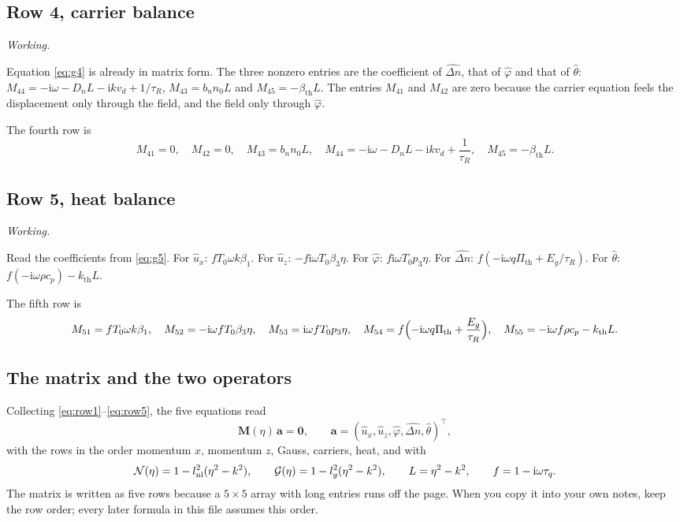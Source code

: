 \documentclass[11pt,a4paper]{article}
\newif\ifshowworked \showworkedtrue
\newenvironment{worked}{\ifshowworked\par\smallskip\noindent\textit{Working.}\par\else\setbox0\vbox\bgroup\fi}{\ifshowworked\par\smallskip\else\egroup\fi}
\newcommand{\Nc}{\mathcal{N}}
\newcommand{\Gc}{\mathcal{G}}
\newcommand{\bth}{\beta_{\mathrm{th}}}
\newcommand{\Pth}{\Pi_{\mathrm{th}}}
\newcommand{\ii}{\mathrm{i}}
\newcommand{\bx}{\hat u_x}
\newcommand{\bz}{\hat u_z}
\newcommand{\bp}{\hat\varphi}
\newcommand{\bn}{\widehat{\Delta n}}
\newcommand{\bt}{\hat\theta}
\newcommand{\kB}{k_{\mathrm{th}}}
\begin{document}
\subsection{Row 4, carrier balance}

\begin{worked}
Equation \eqref{eq:g4} is already in matrix form. The three nonzero entries are the coefficient of $\bn$,
that of $\bp$ and that of $\bt$: $M_{44}=-\ii\omega-D_nL-\ii kv_d+1/\tau_R$, $M_{43}=b_nn_0L$ and
$M_{45}=-\bth L$. The entries $M_{41}$ and $M_{42}$ are zero because the carrier equation feels the
displacement only through the field, and the field only through $\bp$.
\end{worked}

\noindent The fourth row is
\begin{equation}\label{eq:row4}
M_{41}=0,\quad M_{42}=0,\quad M_{43}=b_nn_0L,\quad
M_{44}=-\ii\omega-D_nL-\ii kv_d+\frac{1}{\tau_R},\quad M_{45}=-\bth L .
\end{equation}

\subsection{Row 5, heat balance}

\begin{worked}
Read the coefficients from \eqref{eq:g5}. For $\bx$: $fT_0\omega k\beta_1$. For $\bz$:
$-f\ii\omega T_0\beta_3\eta$. For $\bp$: $f\ii\omega T_0p_3\eta$. For $\bn$:
$f(-\ii\omega q\Pth+E_g/\tau_R)$. For $\bt$: $f(-\ii\omega\rho c_p)-\kB L$.
\end{worked}

\noindent The fifth row is
\begin{equation}\label{eq:row5}
M_{51}=fT_0\omega k\beta_1,\quad
M_{52}=-\ii\omega fT_0\beta_3\eta,\quad
M_{53}=\ii\omega fT_0p_3\eta,\quad
M_{54}=f\Bigl(-\ii\omega q\Pth+\frac{E_g}{\tau_R}\Bigr),\quad
M_{55}=-\ii\omega f\rho c_p-\kB L .
\end{equation}

\subsection{The matrix and the two operators}

Collecting \eqref{eq:row1}--\eqref{eq:row5}, the five equations read
\begin{equation}\label{eq:M}
\mathbf M(\eta)\,\mathbf a=\mathbf 0,\qquad
\mathbf a=(\bx,\bz,\bp,\bn,\bt)^{\top},
\end{equation}
with the rows in the order momentum $x$, momentum $z$, Gauss, carriers, heat, and with
\begin{equation}\label{eq:NG}
\Nc(\eta)=1-l_{\rm nl}^2(\eta^2-k^2),\qquad
\Gc(\eta)=1-l_g^2(\eta^2-k^2),\qquad
L=\eta^2-k^2,\qquad
f=1-\ii\omega\tau_q .
\end{equation}
The matrix is written as five rows because a $5\times5$ array with long entries runs off the page. When you
copy it into your own notes, keep the row order; every later formula in this file assumes this order.
\end{document}
